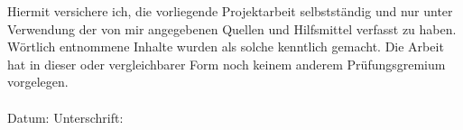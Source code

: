 \label{erklaerung}
\pagestyle{empty}
Hiermit versichere ich, die vorliegende Projektarbeit selbstständig und nur unter Verwendung der von mir angegebenen Quellen und Hilfsmittel verfasst zu haben. Wörtlich entnommene Inhalte wurden als solche kenntlich gemacht. Die Arbeit hat in dieser oder vergleichbarer Form noch keinem anderem Prüfungsgremium vorgelegen. \\
\\[1.5cm]
Datum:	\hrulefill\enspace Unterschrift: \hrulefill
\\[3.5cm]
